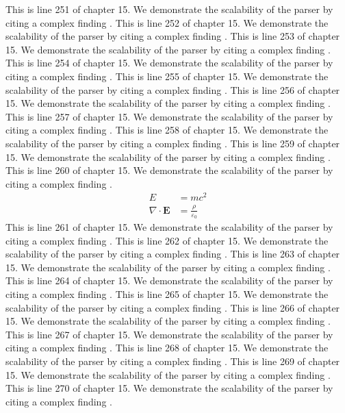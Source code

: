 This is line 251 of chapter 15. We demonstrate the scalability of the parser by citing a complex finding \cite{ref15_251}.
This is line 252 of chapter 15. We demonstrate the scalability of the parser by citing a complex finding \cite{ref15_252}.
This is line 253 of chapter 15. We demonstrate the scalability of the parser by citing a complex finding \cite{ref15_253}.
This is line 254 of chapter 15. We demonstrate the scalability of the parser by citing a complex finding \cite{ref15_254}.
This is line 255 of chapter 15. We demonstrate the scalability of the parser by citing a complex finding \cite{ref15_255}.
This is line 256 of chapter 15. We demonstrate the scalability of the parser by citing a complex finding \cite{ref15_256}.
This is line 257 of chapter 15. We demonstrate the scalability of the parser by citing a complex finding \cite{ref15_257}.
This is line 258 of chapter 15. We demonstrate the scalability of the parser by citing a complex finding \cite{ref15_258}.
This is line 259 of chapter 15. We demonstrate the scalability of the parser by citing a complex finding \cite{ref15_259}.
This is line 260 of chapter 15. We demonstrate the scalability of the parser by citing a complex finding \cite{ref15_260}.
\begin{align*}
  E &= mc^2 \\
  \nabla \cdot \mathbf{E} &= \frac{\rho}{\varepsilon_0}
\end{align*}
This is line 261 of chapter 15. We demonstrate the scalability of the parser by citing a complex finding \cite{ref15_261}.
This is line 262 of chapter 15. We demonstrate the scalability of the parser by citing a complex finding \cite{ref15_262}.
This is line 263 of chapter 15. We demonstrate the scalability of the parser by citing a complex finding \cite{ref15_263}.
This is line 264 of chapter 15. We demonstrate the scalability of the parser by citing a complex finding \cite{ref15_264}.
This is line 265 of chapter 15. We demonstrate the scalability of the parser by citing a complex finding \cite{ref15_265}.
This is line 266 of chapter 15. We demonstrate the scalability of the parser by citing a complex finding \cite{ref15_266}.
This is line 267 of chapter 15. We demonstrate the scalability of the parser by citing a complex finding \cite{ref15_267}.
This is line 268 of chapter 15. We demonstrate the scalability of the parser by citing a complex finding \cite{ref15_268}.
This is line 269 of chapter 15. We demonstrate the scalability of the parser by citing a complex finding \cite{ref15_269}.
This is line 270 of chapter 15. We demonstrate the scalability of the parser by citing a complex finding \cite{ref15_270}.
